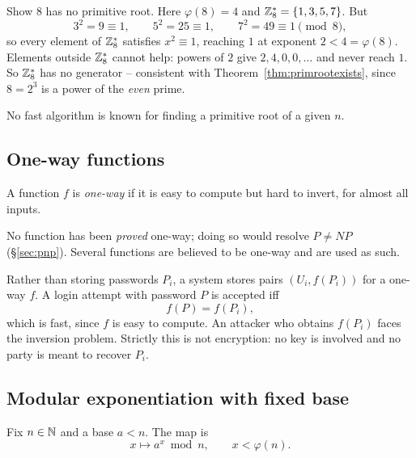 \documentclass[11pt]{article}
\begin{document}
\begin{example}
Show $8$ has no primitive root. Here $\varphi(8)=4$ and $\mathbb{Z}_8^*=\{1,3,5,7\}$. But
\[
3^2=9\equiv1, \qquad 5^2=25\equiv1, \qquad 7^2=49\equiv1 \pmod 8,
\]
so every element of $\mathbb{Z}_8^*$ satisfies $x^2\equiv1$, reaching $1$ at exponent $2<4=\varphi(8)$. Elements outside $\mathbb{Z}_8^*$ cannot help: powers of $2$ give $2,4,0,0,\dots$ and never reach $1$. So $\mathbb{Z}_8^*$ has no generator -- consistent with Theorem~\ref{thm:primrootexists}, since $8=2^3$ is a power of the \emph{even} prime.
\end{example}

\begin{note}
No fast algorithm is known for finding a primitive root of a given $n$.
\end{note}

\subsection{One-way functions}
\label{sec:oneway}

\begin{definition}
A function $f$ is \emph{one-way} if it is easy to compute but hard to invert, for almost all inputs.
\end{definition}

\begin{note}
No function has been \emph{proved} one-way; doing so would resolve $P\ne NP$ (\S\ref{sec:pnp}). Several functions are believed to be one-way and are used as such.
\end{note}

\begin{note}
Rather than storing passwords $P_i$, a system stores pairs $(U_i,f(P_i))$ for a one-way $f$. A login attempt with password $P$ is accepted iff
\[
f(P)=f(P_i),
\]
which is fast, since $f$ is easy to compute. An attacker who obtains $f(P_i)$ faces the inversion problem. Strictly this is not encryption: no key is involved and no party is meant to recover $P_i$.
\end{note}

\subsection{Modular exponentiation with fixed base}
\label{sec:dlog}

\begin{definition}
Fix $n\in\mathbb{N}$ and a base $a<n$. The map is
\[
x\longmapsto a^x\bmod n, \qquad x<\varphi(n).
\]
\end{definition}
\end{document}
